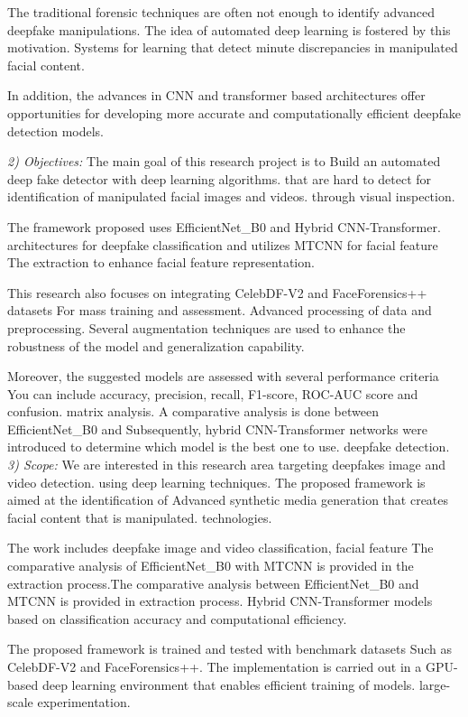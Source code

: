 \documentclass[conference]{IEEEtran}
\begin{document}
The traditional forensic techniques are often not enough to identify advanced
deepfake manipulations. The idea of automated deep learning is fostered by this motivation.
Systems for learning that detect minute discrepancies in manipulated
facial content.

In addition, the advances in CNN and transformer based architectures offer
opportunities for developing more accurate and computationally efficient deepfake
detection models.

\textit{2) Objectives:} The main goal of this research project is to
Build an automated deep fake detector with deep learning algorithms.
that are hard to detect for identification of manipulated facial images and videos.
through visual inspection.

The framework proposed uses EfficientNet\_B0 and Hybrid CNN-Transformer.
architectures for deepfake classification and utilizes MTCNN for facial feature
The extraction to enhance facial feature representation.

This research also focuses on integrating CelebDF-V2 and FaceForensics++ datasets
For mass training and assessment. Advanced processing of data and preprocessing.
Several augmentation techniques are used to enhance the robustness of the model and
generalization capability.

Moreover, the suggested models are assessed with several performance criteria
You can include accuracy, precision, recall, F1-score, ROC-AUC score and confusion.
matrix analysis. A comparative analysis is done between EfficientNet\_B0 and
Subsequently, hybrid CNN-Transformer networks were introduced to determine which model is the best one to use.
deepfake detection.
\textit{3) Scope:} We are interested in this research area targeting deepfakes image and video detection.
using deep learning techniques. The proposed framework is aimed at the identification of
Advanced synthetic media generation that creates facial content that is manipulated.
technologies.

The work includes deepfake image and video classification, facial feature
The comparative analysis of EfficientNet\_B0 with MTCNN is provided in the extraction process.The comparative analysis between EfficientNet\_B0 and MTCNN is provided in extraction process.
Hybrid CNN-Transformer models based on classification accuracy and
computational efficiency.

The proposed framework is trained and tested with benchmark datasets
Such as CelebDF-V2 and FaceForensics++. The implementation is carried out in a
GPU-based deep learning environment that enables efficient training of models.
large-scale experimentation.
\end{document}
